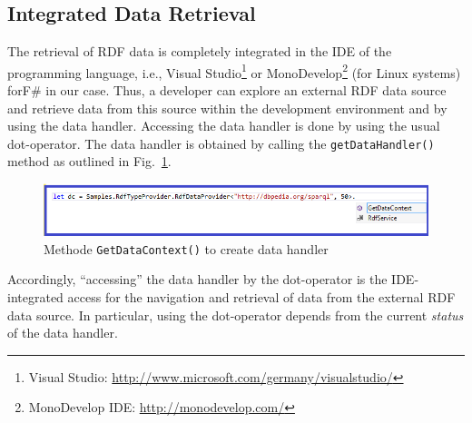 \documentclass{llncs} %
\newcommand{\fs}{\textsf{F\#}\xspace}
\begin{document}
\subsection{Integrated Data Retrieval}
\label{sec:usage:retrieval}

The retrieval of RDF data is completely integrated in the IDE of the programming language,
i.e., Visual Studio\footnote{Visual Studio: \url{http://www.microsoft.com/germany/visualstudio/}}
or MonoDevelop\footnote{MonoDevelop IDE: \url{http://monodevelop.com/}} (for Linux systems) for\fs in our case.
Thus, a developer can explore an external RDF data source and retrieve data from this source
within the development environment and by using the data handler.
Accessing the data handler is done by using  the usual dot-operator.
The data handler is obtained by calling the \texttt{getDataHandler()} method 
as outlined in Fig.~\ref{fig:getdc}.



\begin{figure}[h]
\centering
\includegraphics[width=0.99\linewidth]{./figs/getContext.png}
\caption{Methode \texttt{GetDataContext()} to create data handler}
\label{fig:getdc}
\end{figure}


Accordingly, ``accessing'' the data handler by the dot-operator is the IDE-integrated
access for the navigation and retrieval of data from the external RDF data source.
In particular, using the dot-operator depends from the current \emph{status} of
the data handler. 
\end{document}
